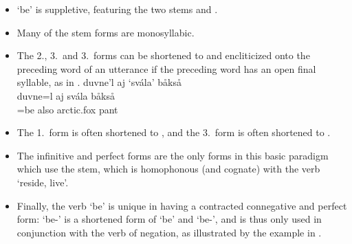 \begin{itemize}
\item {} ‘be’ is suppletive, featuring the two stems  and . 
\item Many of the  stem forms are monosyllabic. 
\item The 2\SGs.\PRSs, 3\SGs.\PRSs\ and 3\PLs.\PRSs\ forms can be shortened to  and encliticized onto the preceding word of an utterance if the preceding word has an open final syllable, as in .
\ea\label{cliticBE}
\glll	duvne'l aj ‘svála’ båkså\\
	duvne=l aj svála båkså\\
	=be\BS{} also arctic.fox\BS{} pant\BS{}\\
	
\z
{}
\item The 1\SGs.\PSTs\ form  is often shortened to , and the 3\PLs.\PSTs\ form  is often shortened to . 
\item The infinitive and perfect forms are the only forms in this basic paradigm which use the  stem, %
which is homophonous (and cognate) with the verb  ‘reside, live’. 
\item Finally, the verb  ‘be’ is unique in having a contracted connegative and perfect form:  ‘be-\BS{}’ is a shortened form of  ‘be\BS{}’ and  ‘be-’, and is thus only used in conjunction with the verb of negation, as illustrated by the example in . 

\end{itemize}
